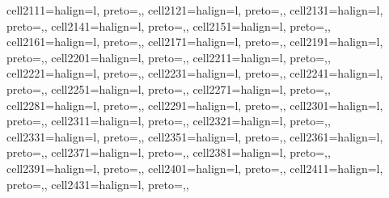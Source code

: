 \begin{table}
\begin{talltblr}
{cell{211}{1}={}{halign=l, preto={\hspace{1em}},},
cell{212}{1}={}{halign=l, preto={\hspace{1em}},},
cell{213}{1}={}{halign=l, preto={\hspace{1em}},},
cell{214}{1}={}{halign=l, preto={\hspace{1em}},},
cell{215}{1}={}{halign=l, preto={\hspace{1em}},},
cell{216}{1}={}{halign=l, preto={\hspace{1em}},},
cell{217}{1}={}{halign=l, preto={\hspace{1em}},},
cell{219}{1}={}{halign=l, preto={\hspace{1em}},},
cell{220}{1}={}{halign=l, preto={\hspace{1em}},},
cell{221}{1}={}{halign=l, preto={\hspace{1em}},},
cell{222}{1}={}{halign=l, preto={\hspace{1em}},},
cell{223}{1}={}{halign=l, preto={\hspace{1em}},},
cell{224}{1}={}{halign=l, preto={\hspace{1em}},},
cell{225}{1}={}{halign=l, preto={\hspace{1em}},},
cell{227}{1}={}{halign=l, preto={\hspace{1em}},},
cell{228}{1}={}{halign=l, preto={\hspace{1em}},},
cell{229}{1}={}{halign=l, preto={\hspace{1em}},},
cell{230}{1}={}{halign=l, preto={\hspace{1em}},},
cell{231}{1}={}{halign=l, preto={\hspace{1em}},},
cell{232}{1}={}{halign=l, preto={\hspace{1em}},},
cell{233}{1}={}{halign=l, preto={\hspace{1em}},},
cell{235}{1}={}{halign=l, preto={\hspace{1em}},},
cell{236}{1}={}{halign=l, preto={\hspace{1em}},},
cell{237}{1}={}{halign=l, preto={\hspace{1em}},},
cell{238}{1}={}{halign=l, preto={\hspace{1em}},},
cell{239}{1}={}{halign=l, preto={\hspace{1em}},},
cell{240}{1}={}{halign=l, preto={\hspace{1em}},},
cell{241}{1}={}{halign=l, preto={\hspace{1em}},},
cell{243}{1}={}{halign=l, preto={\hspace{1em}},},
}
\end{talltblr}
\end{table}

